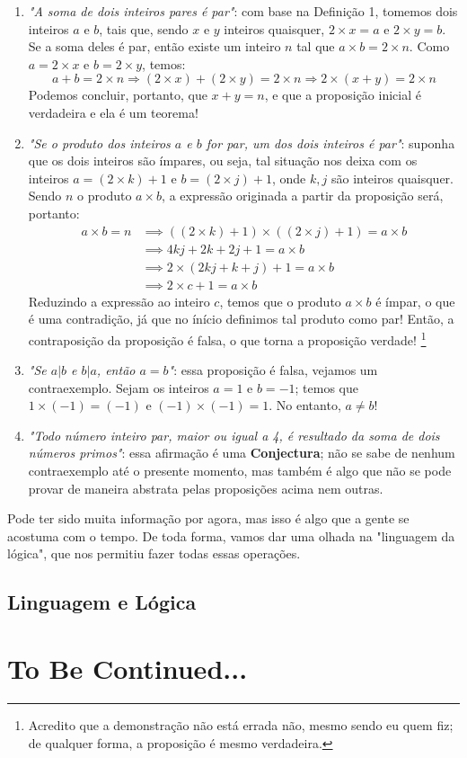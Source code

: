 \documentclass{article}
\begin{document}
\begin{enumerate}
    \item \emph{"A soma de dois inteiros pares é par"}: com base na Definição 1, tomemos dois inteiros $a$ e $b$, tais que, sendo $x$ e $y$ inteiros quaisquer, $2 \times x = a$ e $2 \times y = b$. Se a soma deles é par, então existe um inteiro $n$ tal que $a \times b = 2 \times n$. Como $a = 2 \times x$ e $b = 2 \times y$, temos:
    \begin{equation}
        a + b = 2 \times n
        \Longrightarrow (2 \times x) + (2 \times y) = 2 \times n
        \Longrightarrow 2 \times (x + y) = 2 \times n
    \end{equation}
    Podemos concluir, portanto, que $x + y = n$, e que a proposição inicial é verdadeira e ela é um teorema! 
    \item \emph{"Se o produto dos inteiros $a$ e $b$ for par, um dos dois inteiros é par"}: suponha que os dois inteiros são ímpares, ou seja, tal situação nos deixa com os inteiros $a = (2 \times k) + 1$ e $b = (2 \times j) + 1$, onde $k, j$ são inteiros quaisquer.
    Sendo $n$ o produto $a \times b$, a expressão originada a partir da proposição será, portanto:
        \begin{align*}
        a \times b = n &\implies 
        ((2 \times k) + 1) \times ((2 \times j) + 1) = a \times b \\ &\implies 
        4kj + 2k + 2j + 1 = a \times b \\ &\implies
        2 \times (2kj + k + j) + 1 = a \times b \\ &\implies
        2 \times c + 1 = a \times b
        \end{align*}
    Reduzindo a expressão ao inteiro $c$, temos que o produto $a \times b$ é ímpar, o que é uma contradição, já que no ínício definimos tal produto como par! Então, a contraposição da proposição é falsa, o que torna a proposição verdade!
    \footnote{Acredito que a demonstração não está errada não, mesmo sendo eu quem fiz; de qualquer forma, a proposição é mesmo verdadeira.}
    \item \emph{"Se $a|b$ e $b|a$, então $a = b$"}: essa proposição é falsa, vejamos um contraexemplo. Sejam os inteiros $a = 1$ e $b = -1$; temos que $ 1 \times (-1) = (-1)$ e $(-1) \times (-1) = 1$. No entanto, $a \ne b$!
    \item \emph{"Todo número inteiro par, maior ou igual a 4, é resultado da soma de dois números primos"}: essa afirmação é uma \textbf{Conjectura}; não se sabe de nenhum contraexemplo até o presente momento, mas também é algo que não se pode provar de maneira abstrata pelas proposições acima nem outras.
\end{enumerate}
Pode ter sido muita informação por agora, mas isso é algo que a gente se acostuma com o tempo. De toda forma, vamos dar uma olhada na "linguagem da lógica", que nos permitiu fazer todas essas operações.

\subsection{Linguagem e Lógica}

\section{To Be Continued...}
\end{document}
